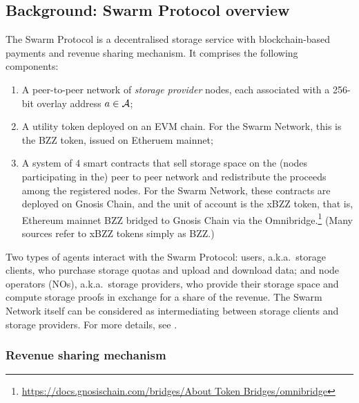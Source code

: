 \subsection{Background: Swarm Protocol overview}
\label{section:overview}

The Swarm Protocol is a decentralised storage service with blockchain-based payments and revenue sharing mechanism.
%
It comprises the following components:
%
\begin{enumerate}
  \item 
    A peer-to-peer network of \emph{storage provider} nodes, each associated with a 256-bit overlay address $a\in\mathcal{A}$;
  \item 
    A utility token deployed on an EVM chain. For the Swarm Network, this is the BZZ token, issued on Etheruem mainnet;
  \item 
    A system of 4 smart contracts that sell storage space on the (nodes participating in the) peer to peer network and redistribute the proceeds among the registered nodes.
    For the Swarm Network, these contracts are deployed on Gnosis Chain, and the unit of account is the xBZZ token, that is, Ethereum mainnet BZZ bridged to Gnosis Chain via the Omnibridge.\footnote{\url{https://docs.gnosischain.com/bridges/About Token Bridges/omnibridge}} 
    (Many sources refer to xBZZ tokens simply as BZZ.)

\end{enumerate}
%
Two types of agents interact with the Swarm Protocol: users, a.k.a.~storage clients, who purchase storage quotas and upload and download data; and node operators (NOs), a.k.a.~storage providers, who provide their storage space and compute storage proofs in exchange for a share of the revenue.
%
The Swarm Network itself can be considered as intermediating between storage clients and storage providers.
%
For more details, see \cite{book-of-swarm}.

\subsubsection{Revenue sharing mechanism}

